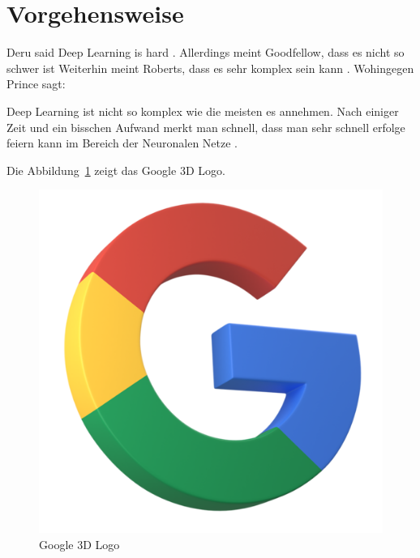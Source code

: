 \section{Vorgehensweise}\label{sec:vorgehensweise}
Deru said Deep Learning is hard \autocite{deruDeepLearningMit2020}.
Allerdings meint Goodfellow, dass es nicht so schwer ist \autocite{goodfellowDeepLearning2016}
Weiterhin meint Roberts, dass es sehr komplex sein kann \autocite{robertsPrinciplesDeepLearning2022}.
Wohingegen Prince sagt: 
\begin{quoting}
Deep Learning ist nicht so komplex wie die meisten es annehmen. Nach einiger Zeit und ein bisschen Aufwand merkt man schnell, dass man sehr schnell erfolge feiern kann im Bereich der Neuronalen Netze \autocite{princeUnderstandingDeepLearning2023}.
\end{quoting}
Die Abbildung~\ref{fig:google3d} zeigt das Google 3D Logo.
\begin{figure}[ht]
  \centering
  \includegraphics[scale=0.25]{google3d}
  \caption{Google 3D Logo}\label{fig:google3d}
\end{figure}
